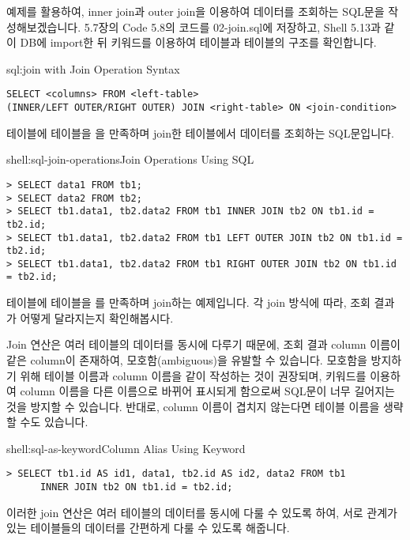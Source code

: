 예제를 활용하여, inner join과 outer join을 이용하여 데이터를 조회하는 SQL문을 작성해보겠습니다. 5.7장의 Code 5.8의 코드를 02-join.sql에 저장하고, Shell 5.13과 같이 DB에 import한 뒤  키워드를 이용하여  테이블과  테이블의 구조를 확인합니다.

\begin{sqlenv}{sql:join}{ with Join Operation Syntax}\begin{verbatim}
SELECT <columns> FROM <left-table>
(INNER/LEFT OUTER/RIGHT OUTER) JOIN <right-table> ON <join-condition>
\end{verbatim}
\end{sqlenv}

\은  테이블에  테이블을 을 만족하며 join한 테이블에서 데이터를 조회하는 SQL문입니다.

\begin{shellenv}{shell:sql-join-operations}{Join Operations Using SQL}\begin{verbatim}
> SELECT data1 FROM tb1;
> SELECT data2 FROM tb2;
> SELECT tb1.data1, tb2.data2 FROM tb1 INNER JOIN tb2 ON tb1.id = tb2.id;
> SELECT tb1.data1, tb2.data2 FROM tb1 LEFT OUTER JOIN tb2 ON tb1.id = tb2.id;
> SELECT tb1.data1, tb2.data2 FROM tb1 RIGHT OUTER JOIN tb2 ON tb1.id = tb2.id;
\end{verbatim}
\end{shellenv}

\는  테이블에  테이블을 를 만족하며 join하는 예제입니다. 각 join 방식에 따라, 조회 결과가 어떻게 달라지는지 확인해봅시다.

Join 연산은 여러 테이블의 데이터를 동시에 다루기 때문에, 조회 결과 column 이름이 같은 column이 존재하여, 모호함(ambiguous)을 유발할 수 있습니다. 모호함을 방지하기 위해 테이블 이름과 column 이름을 같이 작성하는 것이 권장되며,  키워드를 이용하여 column 이름을 다른 이름으로 바뀌어 표시되게 함으로써 SQL문이 너무 길어지는 것을 방지할 수 있습니다. 반대로, column 이름이 겹치지 않는다면 테이블 이름을 생략할 수도 있습니다.

\begin{shellenv}{shell:sql-as-keyword}{Column Alias Using  Keyword}\begin{verbatim}
> SELECT tb1.id AS id1, data1, tb2.id AS id2, data2 FROM tb1
      INNER JOIN tb2 ON tb1.id = tb2.id;
\end{verbatim}
\end{shellenv}

이러한 join 연산은 여러 테이블의 데이터를 동시에 다룰 수 있도록 하여, 서로 관계가 있는 테이블들의 데이터를 간편하게 다룰 수 있도록 해줍니다.
